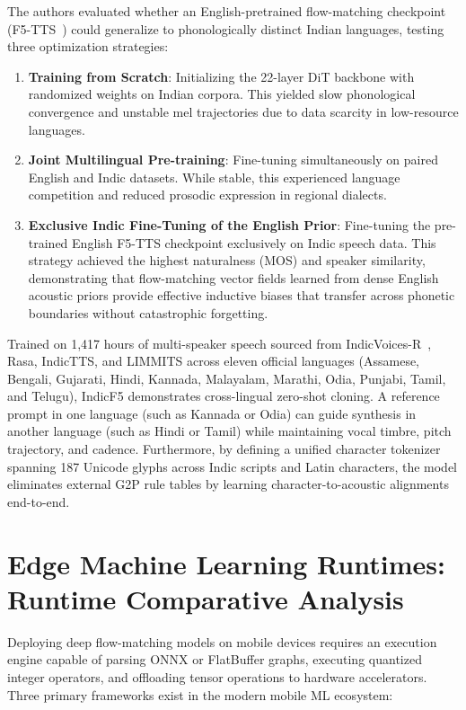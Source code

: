The authors evaluated whether an English-pretrained flow-matching checkpoint (F5-TTS~\cite{chen2024f5tts}) could generalize to phonologically distinct Indian languages, testing three optimization strategies:
\begin{enumerate}[leftmargin=*]
    \item \textbf{Training from Scratch}: Initializing the 22-layer DiT backbone with randomized weights on Indian corpora. This yielded slow phonological convergence and unstable mel trajectories due to data scarcity in low-resource languages.
    \item \textbf{Joint Multilingual Pre-training}: Fine-tuning simultaneously on paired English and Indic datasets. While stable, this experienced language competition and reduced prosodic expression in regional dialects.
    \item \textbf{Exclusive Indic Fine-Tuning of the English Prior}: Fine-tuning the pre-trained English F5-TTS checkpoint exclusively on Indic speech data. This strategy achieved the highest naturalness (MOS) and speaker similarity, demonstrating that flow-matching vector fields learned from dense English acoustic priors provide effective inductive biases that transfer across phonetic boundaries without catastrophic forgetting.
\end{enumerate}

Trained on 1,417 hours of multi-speaker speech sourced from IndicVoices-R~\cite{indicvoices2024}, Rasa, IndicTTS, and LIMMITS across eleven official languages (Assamese, Bengali, Gujarati, Hindi, Kannada, Malayalam, Marathi, Odia, Punjabi, Tamil, and Telugu), IndicF5 demonstrates cross-lingual zero-shot cloning. A reference prompt in one language (such as Kannada or Odia) can guide synthesis in another language (such as Hindi or Tamil) while maintaining vocal timbre, pitch trajectory, and cadence. Furthermore, by defining a unified character tokenizer spanning 187 Unicode glyphs across Indic scripts and Latin characters, the model eliminates external G2P rule tables by learning character-to-acoustic alignments end-to-end.

\section{Edge Machine Learning Runtimes: Runtime Comparative Analysis}
Deploying deep flow-matching models on mobile devices requires an execution engine capable of parsing ONNX or FlatBuffer graphs, executing quantized integer operators, and offloading tensor operations to hardware accelerators. Three primary frameworks exist in the modern mobile ML ecosystem:

